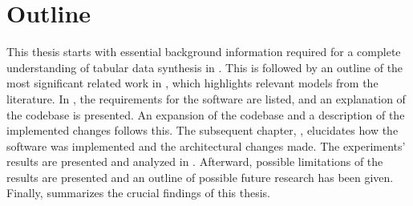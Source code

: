 \newpage
\section{Outline}
\label{ch:intro-outline}

This thesis starts with essential background information required for a complete understanding of tabular data synthesis in .
This is followed by an outline of the most significant related work in , which highlights relevant models from the literature.
In , the requirements for the software are listed, and an explanation of the codebase is presented. 
An expansion of the codebase and a description of the implemented changes follows this. 
The subsequent chapter, , elucidates how the software was implemented and the architectural changes made.
The experiments' results are presented and analyzed in . 
Afterward, possible limitations of the results are presented and an outline of possible future research has been given. 
Finally,  summarizes the crucial findings of this thesis.